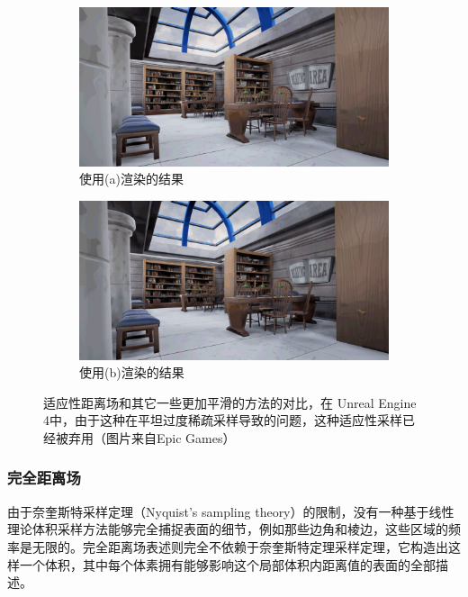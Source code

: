 \begin{figure}
\begin{fullwidth}
\begin{subfigure}[b]{0.5\thewidth}
		\includegraphics[width=\textwidth]{figures/df/DFAO_Scene_OldMethod}
		\caption{使用(a)渲染的结果}
	\end{subfigure}
	\begin{subfigure}[b]{0.5\thewidth}
		\includegraphics[width=\textwidth]{figures/df/DFAO_Scene_NewMethod}
		\caption{使用(b)渲染的结果}
	\end{subfigure}
	\caption{适应性距离场和其它一些更加平滑的方法的对比，在 Unreal Engine 4中，由于这种在平坦过度稀疏采样导致的问题，这种适应性采样已经被弃用（图片来自Epic Games）}
	\label{f:ue4-adf-problem}
\end{fullwidth}
\end{figure}




\subsubsection{完全距离场}
由于奈奎斯特采样定理（Nyquist’s sampling theory）的限制，没有一种基于线性理论体积采样方法能够完全捕捉表面的细节，例如那些边角和棱边，这些区域的频率是无限的。完全距离场表述则完全不依赖于奈奎斯特定理采样定理，它构造出这样一个体积，其中每个体素拥有能够影响这个局部体积内距离值的表面的全部描述。

